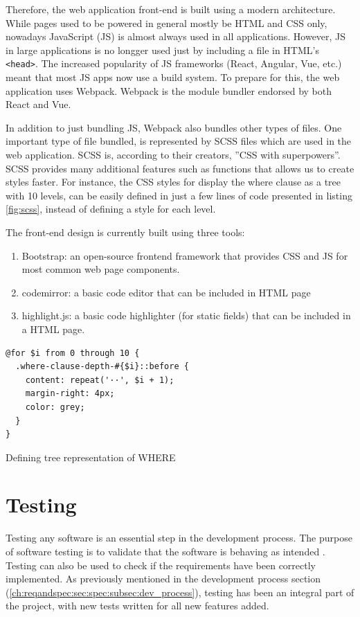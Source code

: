 Therefore, the web application front-end is built using a modern architecture. While pages used to be powered in general mostly be HTML and CSS only, nowadays JavaScript (JS) is almost always used in all applications. However, JS in large applications is no longger used just by including a file in HTML's \texttt{<head>}. The increased popularity of JS frameworks (React, Angular, Vue, etc.) meant that most JS apps now use a build system. To prepare for this, the web application uses Webpack.  Webpack is the  module bundler endorsed by both React and Vue.

In addition to just bundling JS, Webpack also bundles other types of files. One important type of file bundled, is represented by SCSS files which are used in the web application. SCSS is, according to their creators, ''CSS with superpowers''. SCSS provides many additional features such as functions that allows us to create styles faster. For instance, the CSS styles for display the where clause as a tree with 10 levels, can be easily defined in just a few lines of code presented in listing \ref{fig:scss}, instead of defining a style for each level.

The front-end design is currently built using three tools:
\begin{enumerate}
    \item Bootstrap: an open-source frontend framework that provides CSS and JS for most common web page components.
    \item codemirror: a basic code editor that can be included in HTML page
    \item  highlight.js: a basic code highlighter (for static fields) that can be included in a HTML page.
\end{enumerate}

\begin{listing}
\begin{verbatim}
@for $i from 0 through 10 {
  .where-clause-depth-#{$i}::before {
    content: repeat('··', $i + 1);
    margin-right: 4px;
    color: grey;
  }
}
\end{verbatim}
\caption{Defining tree representation of WHERE}
\label{fig:scss}
\end{listing}

\section{Testing}

Testing any software is an essential step in the development process. The purpose of software testing is to validate that the software is behaving as intended \citep{lit:software_testing}. Testing can also be used to check if the requirements have been correctly implemented. As previously mentioned in the development process section (\ref{ch:reqandspec:sec:spec:subsec:dev_process}), testing has been an integral part of the project, with new tests written for all new features added.

